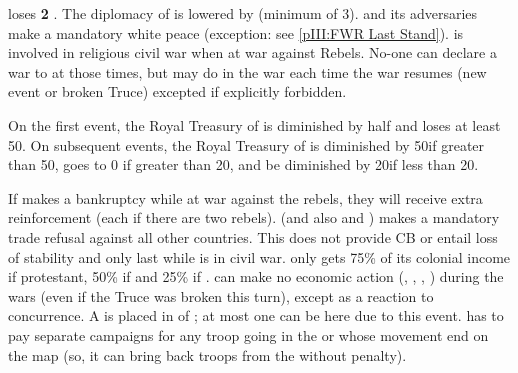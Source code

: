 \begin{digressions}



  \phevnt
  \aparag \FRA loses {\bf 2} \STAB.
  \aparag The diplomacy of \FRA is lowered by  (minimum of 3).
  \aparag \FRA and its adversaries make a mandatory white peace (exception:
  see \ref{pIII:FWR Last Stand}).
  \aparag \FRA is involved in religious civil war when at war against
  Rebels. No-one can declare a war to \FRA at those times, but \MAJ may do
   in the war each time the war resumes (new event
  or broken Truce) excepted if explicitly forbidden.



  \phevnt
  \aparag On the first event, the Royal Treasury of \FRA is diminished by half
  and loses at least 50\ducats.  On subsequent events, the Royal Treasury of
  \FRA is diminished by 50\ducats if greater than 50\ducats, goes to 0\ducats
  if greater than 20\ducats, and be diminished by 20\ducats if less than
  20\ducats.

  \bparag If \FRA makes a bankruptcy while at war against the rebels, they
  will receive \ARMY\facemoins extra reinforcement (\LD each if there are two
  rebels).
  \aparag \FRA (and also \hug and \lig) makes a mandatory trade refusal
  against all other countries. This does not provide CB or entail loss of
  stability and only last while \FRA is in civil war.
  \bparag \FRA only gets 75\% of its colonial income if protestant, 50\% if
  \CATHCO and 25\% if \CATHCR.
  \aparag \FRA can make no economic action (\COL, \TP, \TFI, \CONC) during the
  wars (even if the Truce was broken this turn), except as a reaction to
  concurrence.
  \aparag A \PIRATE\faceplus is placed in \CTZ of \FRA; at most one \PIRATE
  can be here due to this event.
  \aparag \FRA has to pay separate campaigns for any troop going in the \ROTW
  or whose movement end on the \ROTW map (so, it can bring back troops from
  the \ROTW without penalty).



\end{digressions}
